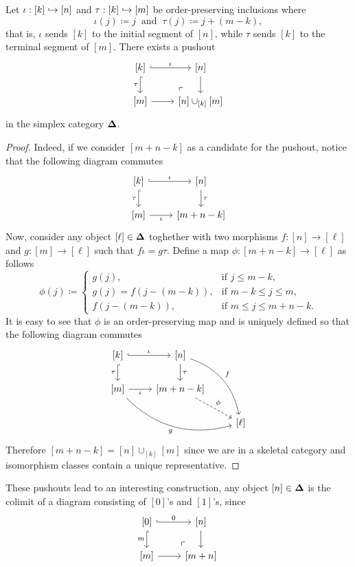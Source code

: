 \begin{lemma}
\label{lem:}
Let \(\iota: [k] \hookrightarrow [n]\) and \(\tau: [k] \hookrightarrow [m]\) be order-preserving
inclusions where
\[
\iota(j) \coloneq j\ \text{ and }\ \tau(j) \coloneq j + (m - k),
\]
that is, \(\iota\) sends \([k]\) to the initial segment of \([n]\), while
\(\tau\) sends \([k]\) to the terminal segment of \([m]\). There exists a
pushout
\[
\begin{tikzcd}
{[k]} \ar[r, hook, "\iota"] \ar[d, hook, "\tau"']
\ar[rd, "\ulcorner", very near end, phantom]
&{[n]} \ar[d] \\
{[m]} \ar[r] &{[n] \cup_{[k]} [m]}
\end{tikzcd}
\]
in the simplex category \({\mathbf{\Delta}}\).
\end{lemma}

\begin{proof}
Indeed, if we consider \([m + n - k]\) as a candidate for the pushout, notice
that the following diagram commutes
\[
\begin{tikzcd}
{[k]} \ar[r, hook, "\iota"] \ar[d, hook, "\tau"']
&{[n]} \ar[d, "\tau"] \\
{[m]} \ar[r, "\iota"'] &{[m + n - k]}
\end{tikzcd}
\]
Now, consider any object \([\ell] \in {\mathbf{\Delta}}\) toghether with two morphisms
\(f: [n] \to [\ell]\) and \(g: [m] \to [\ell]\) such that \(f \iota = g
\tau\). Define a map \(\phi: [m + n - k] \to [\ell]\) as follows
\[
\phi(j) \coloneq
\begin{cases}
  g(j),                  &\text{if } j \leq m - k, \\
  g(j) = f(j - (m - k)), &\text{if } m - k \leq j \leq m, \\
  f(j - (m - k)),        &\text{if } m \leq j \leq m + n - k.
\end{cases}
\]
It is easy to see that \(\phi\) is an order-preserving map and is uniquely
defined so that the following diagram commutes
\[
\begin{tikzcd}
{[k]} \ar[r, hook, "\iota"] \ar[d, hook, "\tau"']
&{[n]} \ar[d, "\tau"] \ar[drd, bend left, "f"] & \\
{[m]} \ar[r, "\iota"'] \ar[rrd, bend right, "g"']
&{[m + n - k]} \ar[rd, dashed, "\phi"] & \\
& &{[\ell]}
\end{tikzcd}
\]
Therefore \([m + n - k] = [n] \cup_{[k]} [m]\) since we are in a skeletal
category and isomorphism classes contain a unique representative.
\end{proof}

These pushouts lead to an interesting construction, any object \([n] \in {\mathbf{\Delta}}\)
is the colimit of a diagram consisting of \([0]\)'s and \([1]\)'s, since
\[
\begin{tikzcd}
{[0]} \ar[r, hook, "0"]
\ar[d, hook, "m"'] \ar[rd, phantom, very near end, "\ulcorner"]
&{[n]} \ar[d] \\
{[m]} \ar[r] &{[m + n]}
\end{tikzcd}
\]

